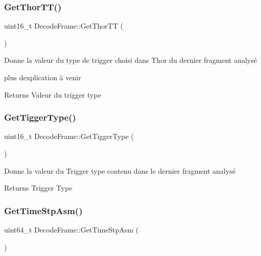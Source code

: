 \subsubsection{\texorpdfstring{Get\+Thor\+T\+T()}{GetThorTT()}}
{\footnotesize\ttfamily uint16\+\_\+t Decode\+Frame\+::\+Get\+Thor\+TT (\begin{DoxyParamCaption}{ }\end{DoxyParamCaption})\hspace{0.3cm}{\ttfamily [inline]}}



Donne la valeur du type de trigger choisi dans Thor du dernier fragment analysé 

plus d\textquotesingle{}explication à venir \begin{DoxyReturn}{Returns}
Valeur du trigger type 
\end{DoxyReturn}
\mbox{\label{classDecodeFrame_a4bd099178e4f7a067dac451d2cb844b2}} 
\subsubsection{\texorpdfstring{Get\+Tigger\+Type()}{GetTiggerType()}}
{\footnotesize\ttfamily uint16\+\_\+t Decode\+Frame\+::\+Get\+Tigger\+Type (\begin{DoxyParamCaption}{ }\end{DoxyParamCaption})\hspace{0.3cm}{\ttfamily [inline]}}



Donne la valeur du Trigger type contenu dans le dernier fragment analysé 

\begin{DoxyReturn}{Returns}
Trigger Type 
\end{DoxyReturn}
\mbox{\label{classDecodeFrame_a8ceda592a6bd4ed68faaeeda53b433a0}} 
\subsubsection{\texorpdfstring{Get\+Time\+Stp\+Asm()}{GetTimeStpAsm()}}
{\footnotesize\ttfamily uint64\+\_\+t Decode\+Frame\+::\+Get\+Time\+Stp\+Asm (\begin{DoxyParamCaption}{ }\end{DoxyParamCaption})\hspace{0.3cm}{\ttfamily [inline]}}



